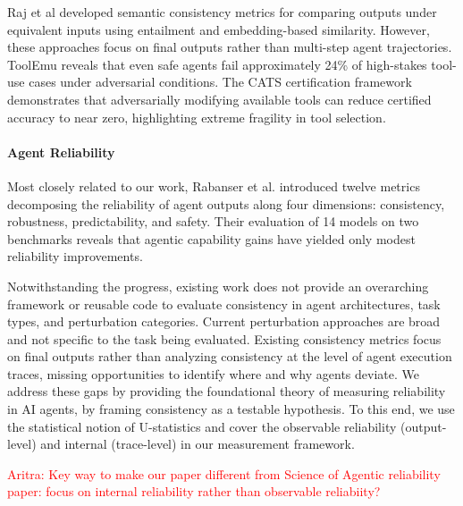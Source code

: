 \documentclass{article}
\newcommand{\ag}[1]{\textcolor{red}{Aritra: #1}}
\theoremstyle{plain}
\theoremstyle{definition}
\theoremstyle{remark}
\begin{document}
Raj et al \cite{raj2023measuringreliabilitylargelanguage} developed semantic consistency metrics for comparing outputs under equivalent inputs using entailment and embedding-based similarity. However, these approaches focus on final outputs rather than multi-step agent trajectories. ToolEmu \cite{ruan2024toolemu} reveals that even safe agents fail approximately 24\% of high-stakes tool-use cases under adversarial conditions. The CATS certification framework \cite{huang2024cats} demonstrates that adversarially modifying available tools can reduce certified accuracy to near zero, highlighting extreme fragility in tool selection.

\paragraph{Agent Reliability}
Most closely related to our work, Rabanser et al. \cite{rabanser2026scienceaiagentreliability} introduced twelve metrics decomposing the reliability of agent outputs along four dimensions: consistency, robustness, predictability, and safety. Their evaluation of 14 models on two benchmarks reveals that agentic capability gains have yielded only modest reliability improvements.

\vspace{1em}
Notwithstanding the progress, existing work does not provide an overarching framework or reusable code to evaluate consistency in agent architectures, task types, and perturbation categories. Current perturbation approaches are broad and not specific to the task being evaluated. Existing consistency metrics focus on final outputs rather than analyzing consistency at the level of agent execution traces, missing opportunities to identify where and why agents deviate. We address these gaps by providing the foundational theory of measuring reliability in AI agents, by framing consistency as a testable hypothesis. To this end, we use the statistical notion of U-statistics \cite{lee1990ustatistics} and cover the observable reliability (output-level) and internal (trace-level) in our measurement framework.

\ag{Key way to make our paper different from Science of Agentic reliability paper: focus on internal reliability rather than observable reliabiity?}
\end{document}
